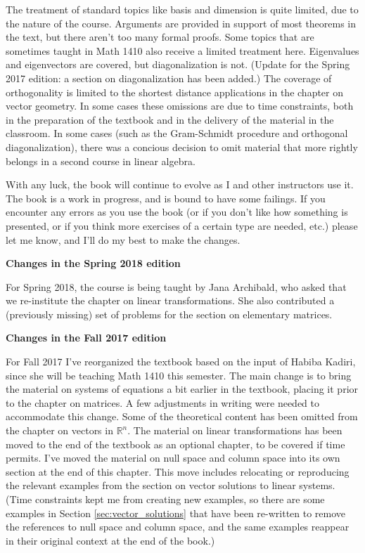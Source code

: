 The treatment of standard topics like basis and dimension is quite limited, due to the nature of the course. Arguments are provided in support of most theorems in the text, but there aren't too many formal proofs. Some topics that are sometimes taught in Math 1410 also receive a limited treatment here. Eigenvalues and eigenvectors are covered, but diagonalization is not. (Update for the Spring 2017 edition: a section on diagonalization has been added.) The coverage of orthogonality is limited to the shortest distance applications in the chapter on vector geometry. In some cases these omissions are due to time constraints, both in the preparation of the textbook and in the delivery of the material in the classroom. In some cases (such as the Gram-Schmidt procedure and orthogonal diagonalization), there was a concious decision to omit material that more rightly belongs in a second course in linear algebra.

With any luck, the book will continue to evolve as I and other instructors use it. The book is a work in progress, and is bound to have some failings. If you encounter any errors as you use the book (or if you don't like how something is presented, or if you think more exercises of a certain type are needed, etc.) please let me know, and I'll do my best to make the changes. 



\pagebreak

\noindent\textbf{\large Changes in the Spring 2018 edition}

For Spring 2018, the course is being taught by Jana Archibald, who asked that we re-institute the chapter on linear transformations. She also contributed a (previously missing) set of problems for the section on elementary matrices.

\bigskip

\noindent\textbf{\large Changes in the Fall 2017 edition}

For Fall 2017 I've reorganized the textbook based on the input of Habiba Kadiri, since she will be teaching Math 1410 this semester. The main change is to bring the material on systems of equations a bit earlier in the textbook, placing it prior to the chapter on matrices. A few adjustments in writing were needed to accommodate this change. Some of the theoretical content has been omitted from the chapter on vectors in $\mathbb{R}^n$. The material on linear transformations has been moved to the end of the textbook as an optional chapter, to be covered if time permits. I've moved the material on null space and column space into its own section at the end of this chapter. This move includes relocating or reproducing the relevant examples from the section on vector solutions to linear systems. (Time constraints kept me from creating new examples, so there are some examples in Section \ref{sec:vector_solutions} that have been re-written to remove the references to null space and column space, and the same examples reappear in their original context at the end of the book.)

